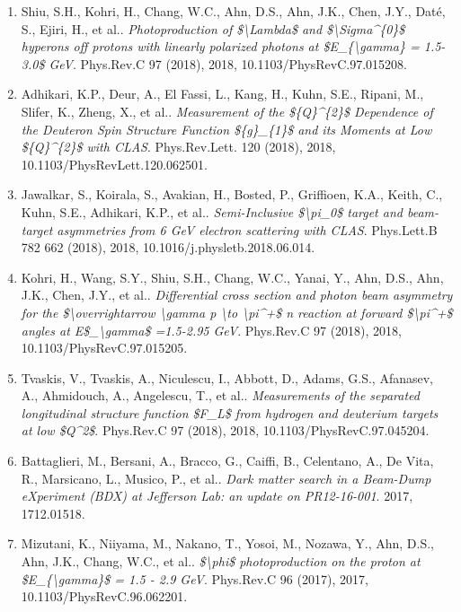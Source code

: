 \begin{enumerate}
\item Shiu, S.H., Kohri, H., Chang, W.C., Ahn, D.S., Ahn, J.K., Chen, J.Y., Daté, S., Ejiri, H., et al.. \textit{Photoproduction of \$\textbackslash{}Lambda\$ and \$\textbackslash{}Sigma\textasciicircum{}\{0\}\$ hyperons off protons with linearly polarized photons at \$E\_\{\textbackslash{}gamma\} = 1.5-3.0\$ GeV}. Phys.Rev.C 97 (2018), 2018, 10.1103/PhysRevC.97.015208.
\item Adhikari, K.P., Deur, A., El Fassi, L., Kang, H., Kuhn, S.E., Ripani, M., Slifer, K., Zheng, X., et al.. \textit{Measurement of the \$\{Q\}\textasciicircum{}\{2\}\$ Dependence of the Deuteron Spin Structure Function \$\{g\}\_\{1\}\$ and its Moments at Low \$\{Q\}\textasciicircum{}\{2\}\$ with CLAS}. Phys.Rev.Lett. 120 (2018), 2018, 10.1103/PhysRevLett.120.062501.
\item Jawalkar, S., Koirala, S., Avakian, H., Bosted, P., Griffioen, K.A., Keith, C., Kuhn, S.E., Adhikari, K.P., et al.. \textit{Semi-Inclusive \$\textbackslash{}pi\_0\$ target and beam-target asymmetries from 6 GeV electron scattering with CLAS}. Phys.Lett.B 782 662 (2018), 2018, 10.1016/j.physletb.2018.06.014.
\item Kohri, H., Wang, S.Y., Shiu, S.H., Chang, W.C., Yanai, Y., Ahn, D.S., Ahn, J.K., Chen, J.Y., et al.. \textit{Differential cross section and photon beam asymmetry for the \$\textbackslash{}overrightarrow \textbackslash{}gamma p \textbackslash{}to \textbackslash{}pi\textasciicircum{}+\$ n reaction at forward \$\textbackslash{}pi\textasciicircum{}+\$ angles at E\$\_\textbackslash{}gamma\$ =1.5-2.95 GeV}. Phys.Rev.C 97 (2018), 2018, 10.1103/PhysRevC.97.015205.
\item Tvaskis, V., Tvaskis, A., Niculescu, I., Abbott, D., Adams, G.S., Afanasev, A., Ahmidouch, A., Angelescu, T., et al.. \textit{Measurements of the separated longitudinal structure function \$F\_L\$ from hydrogen and deuterium targets at low \$Q\textasciicircum{}2\$}. Phys.Rev.C 97 (2018), 2018, 10.1103/PhysRevC.97.045204.
\item Battaglieri, M., Bersani, A., Bracco, G., Caiffi, B., Celentano, A., De Vita, R., Marsicano, L., Musico, P., et al.. \textit{Dark matter search in a Beam-Dump eXperiment (BDX) at Jefferson Lab: an update on PR12-16-001}. 2017, 1712.01518.
\item Mizutani, K., Niiyama, M., Nakano, T., Yosoi, M., Nozawa, Y., Ahn, D.S., Ahn, J.K., Chang, W.C., et al.. \textit{\$\textbackslash{}phi\$ photoproduction on the proton at \$E\_\{\textbackslash{}gamma\}\$ = 1.5 - 2.9 GeV}. Phys.Rev.C 96 (2017), 2017, 10.1103/PhysRevC.96.062201.

\end{enumerate}
